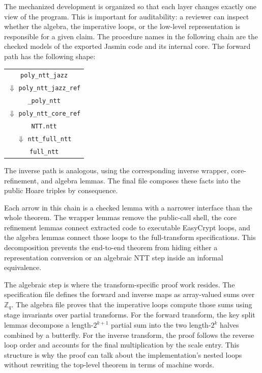 \documentclass[10pt,twocolumn]{article}
\newcommand{\ec}{EasyCrypt}
\newcommand{\jasmin}{Jasmin}
\newcommand{\Zq}{\mathbb{Z}_q}
\begin{document}
The mechanized development is organized so that each layer changes exactly one
view of the program. This is important for auditability: a reviewer can inspect
whether the algebra, the imperative loops, or the low-level representation is
responsible for a given claim. The procedure names in the following chain are the
checked  models of the exported \jasmin{} code and its
internal core. The forward path has the following shape:
\begin{center}
\scriptsize
\begin{tabular}{c}
\texttt{poly\_ntt\_jazz} \\
\(\Downarrow\) \texttt{poly\_ntt\_jazz\_ref} \\
\texttt{\_poly\_ntt} \\
\(\Downarrow\) \texttt{poly\_ntt\_core\_ref} \\
\texttt{NTT.ntt} \\
\(\Downarrow\) \texttt{ntt\_full\_ntt} \\
\texttt{full\_ntt}
\end{tabular}
\end{center}
The inverse path is analogous, using the corresponding inverse wrapper,
core-refinement, and algebra lemmas. The final file 
composes these facts into the public Hoare triples by consequence.

Each arrow in this chain is a checked lemma with a narrower interface than the
whole theorem. The wrapper lemmas remove the public-call shell, the core
refinement lemmas connect extracted code to executable \ec{} loops, and the
algebra lemmas connect those loops to the full-transform specifications. This
decomposition prevents the end-to-end theorem from hiding either a
representation conversion or an algebraic NTT step inside an informal
equivalence.

The algebraic step is where the transform-specific proof work resides. The
specification file defines the forward and inverse maps as array-valued sums
over \(\Zq\). The algebra file proves that the imperative loops compute those
sums using stage invariants over partial transforms. For the forward transform,
the key split lemmas decompose a length-\(2^{k+1}\) partial sum into the two
length-\(2^k\) halves combined by a butterfly. For the inverse transform, the
proof follows the reverse loop order and accounts for the final multiplication
by the scale entry. This structure is why the proof can talk about the
implementation's nested loops without rewriting the top-level theorem in terms
of machine words.
\end{document}
